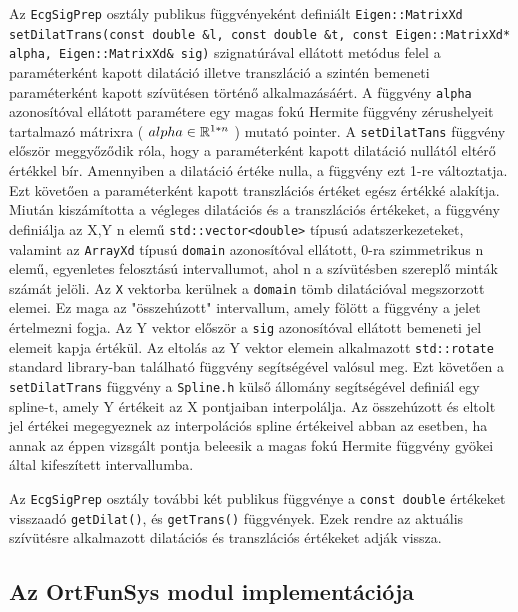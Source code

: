 \documentclass[oneside,titlepage,12pt,a4paper]{report}
\begin{document}
\par  Az \texttt{EcgSigPrep} osztály publikus függvényeként definiált \texttt{Eigen::MatrixXd} \linebreak \texttt{setDilatTrans(const double \&l, const double \&t, const Eigen::MatrixXd*} \linebreak \texttt{alpha, Eigen::MatrixXd\& sig)} szignatúrával ellátott metódus felel a paraméterként kapott dilatáció illetve transzláció a szintén bemeneti paraméterként kapott szívütésen történő alkalmazásáért. A függvény \texttt{alpha} azonosítóval ellátott paramétere egy magas fokú Hermite függvény zérushelyeit tartalmazó mátrixra ( $ alpha \in \Bbb R^{1*n} $ ) mutató pointer. A \texttt{setDilatTans} függvény először meggyőződik róla, hogy a paraméterként kapott dilatáció nullától eltérő értékkel bír. Amennyiben a dilatáció értéke nulla, a függvény ezt 1-re változtatja. Ezt követően a paraméterként kapott transzlációs értéket egész értékké alakítja. Miután kiszámította a végleges dilatációs és a transzlációs értékeket, a függvény definiálja az X,Y n elemű \texttt{std::vector<double>} típusú adatszerkezeteket, valamint az \texttt{ArrayXd} típusú \texttt{domain} azonosítóval ellátott, 0-ra szimmetrikus n elemű, egyenletes felosztású intervallumot, ahol n a szívütésben szereplő minták számát jelöli. Az \texttt{X} vektorba kerülnek a \texttt{domain} tömb dilatációval megszorzott elemei. Ez maga az "összehúzott" intervallum, amely fölött a függvény a jelet értelmezni fogja. Az Y vektor először a \texttt{sig} azonosítóval ellátott bemeneti jel elemeit kapja értékül. Az eltolás az Y vektor elemein alkalmazott \texttt{std::rotate} standard library-ban található függvény segítségével valósul meg. Ezt követően a \texttt{setDilatTrans} függvény a \texttt{Spline.h} külső állomány segítségével definiál egy spline-t, amely Y értékeit az X pontjaiban interpolálja. Az összehúzott és eltolt jel értékei megegyeznek az interpolációs spline értékeivel abban az esetben, ha annak az éppen vizsgált pontja beleesik a magas fokú Hermite függvény gyökei által kifeszített intervallumba. 
\par Az \texttt{EcgSigPrep} osztály további két publikus függvénye a \texttt{const double} értékeket visszaadó \texttt{getDilat()}, és \texttt{getTrans()} függvények. Ezek rendre az aktuális szívütésre alkalmazott dilatációs és transzlációs értékeket adják vissza.     

\subsection{Az OrtFunSys modul implementációja}
\end{document}
